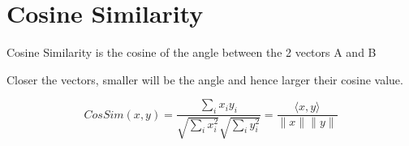 	\section{Cosine Similarity}
	\begin{bulletedlist}
		\item Cosine Similarity is the cosine of the angle between the 2 vectors A and B
		\item Closer the vectors, smaller will be the angle and hence larger their cosine value.
	\end{bulletedlist}

	\begin{equation}\label{eqn:cosinesimilarity}
		CosSim(x,y) = \frac{\sum_i x_i y_i}{\sqrt{\sum_i x_i^2}\sqrt{\sum_i y_i^2}} = \frac{\langle x,y\rangle}{\|x\|\|y\|}
	\end{equation}